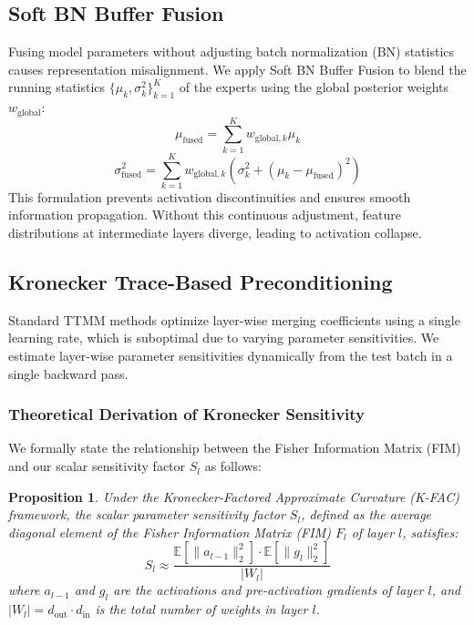 \documentclass{article}
\theoremstyle{plain}
\newtheorem{proposition}[theorem]{Proposition}
\theoremstyle{definition}
\theoremstyle{remark}
\begin{document}
\subsection{Soft BN Buffer Fusion}
Fusing model parameters without adjusting batch normalization (BN) statistics causes representation misalignment. We apply Soft BN Buffer Fusion to blend the running statistics $\{\mu_k, \sigma_k^2\}_{k=1}^K$ of the experts using the global posterior weights $w_{\text{global}}$:
\begin{equation}
\mu_{\text{fused}} = \sum_{k=1}^K w_{\text{global}, k} \mu_k
\end{equation}
\begin{equation}
\sigma_{\text{fused}}^2 = \sum_{k=1}^K w_{\text{global}, k} \left( \sigma_k^2 + (\mu_k - \mu_{\text{fused}})^2 \right)
\end{equation}
This formulation prevents activation discontinuities and ensures smooth information propagation. Without this continuous adjustment, feature distributions at intermediate layers diverge, leading to activation collapse.

\subsection{Kronecker Trace-Based Preconditioning}
Standard TTMM methods optimize layer-wise merging coefficients using a single learning rate, which is suboptimal due to varying parameter sensitivities. We estimate layer-wise parameter sensitivities dynamically from the test batch in a single backward pass.

\subsubsection{Theoretical Derivation of Kronecker Sensitivity}
We formally state the relationship between the Fisher Information Matrix (FIM) and our scalar sensitivity factor $S_l$ as follows:

\begin{proposition}
Under the Kronecker-Factored Approximate Curvature (K-FAC) framework, the scalar parameter sensitivity factor $S_l$, defined as the average diagonal element of the Fisher Information Matrix (FIM) $F_l$ of layer $l$, satisfies:
\begin{equation}
S_l \approx \frac{\mathbb{E}[\|a_{l-1}\|_2^2] \cdot \mathbb{E}[\|g_l\|_2^2]}{|W_l|}
\end{equation}
where $a_{l-1}$ and $g_l$ are the activations and pre-activation gradients of layer $l$, and $|W_l| = d_{\text{out}} \cdot d_{\text{in}}$ is the total number of weights in layer $l$.
\end{proposition}
\end{document}
